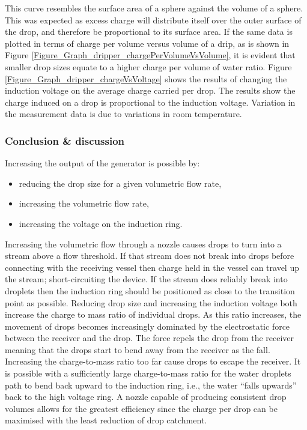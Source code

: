     This curve resembles the surface area of a sphere against the volume of a sphere.
    This was expected as excess charge will distribute itself over the outer surface of the drop, and therefore be proportional to its surface area.
    If the same data is plotted in terms of charge per volume versus volume of a drip, as is shown in Figure \ref{Figure_Graph_dripper_chargePerVolumeVsVolume}, it is evident that smaller drop sizes equate to a higher charge per volume of water ratio.
    Figure \ref{Figure_Graph_dripper_chargeVsVoltage} shows the results of changing the induction voltage on the average charge carried per drop.
    The results show the charge induced on a drop is proportional to the induction voltage.
    Variation in the measurement data is due to variations in room temperature.


  \subsubsection*{Conclusion \& discussion}

    Increasing the output of the generator is possible by:
    \begin{itemize}
    \item reducing the drop size for a given volumetric flow rate,
    \item increasing the volumetric flow rate,
    \item increasing the voltage on the induction ring.
    \end{itemize}
    Increasing the volumetric flow through a nozzle causes drops to turn into a stream above a flow threshold.
    If that stream does not break into drops before connecting with the receiving vessel then charge held in the vessel can travel up the stream; short-circuiting the device.
    If the stream does reliably break into droplets then the induction ring should be positioned as close to the transition point as possible.
    Reducing drop size and increasing the induction voltage both increase the charge to mass ratio of individual drops.
    As this ratio increases, the movement of drops becomes increasingly dominated by the electrostatic force between the receiver and the drop.
    The force repels the drop from the receiver meaning that the drops start to bend away from the receiver as the fall.
    Increasing the charge-to-mass ratio too far cause drops to escape the receiver.
    It is possible with a sufficiently large charge-to-mass ratio for the water droplets path to bend back upward to the induction ring, i.e., the water ``falls upwards'' back to the high voltage ring.
    A nozzle capable of producing consistent drop volumes allows for the greatest efficiency since the charge per drop can be maximised with the least reduction of drop catchment.

